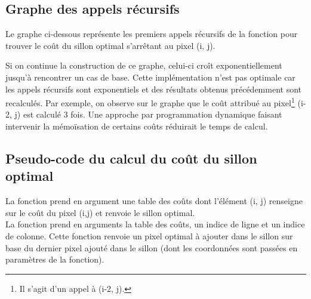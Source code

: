 \documentclass[a4paper, 11pt, oneside]{article}
\begin{document}
\subsection{Graphe des appels récursifs}

Le graphe ci-dessous représente les premiers appels récursifs de la fonction pour trouver le coût du sillon optimal s'arrêtant au pixel (i, j). 

\begin{center}
\end{center}

Si on continue la construction de ce graphe, celui-ci croît exponentiellement jusqu'à rencontrer un cas de base. Cette implémentation n'est pas optimale car les appels récursifs sont exponentiels et des résultats obtenus précédemment sont recalculés. Par exemple, on observe sur le graphe que le coût attribué au pixel\footnote{Il s'agit d'un appel à (i-2, j).} (i-2, j) est calculé 3 fois. Une approche par programmation dynamique faisant intervenir la mémoïsation de certains coûts réduirait le temps de calcul.

\subsection{Pseudo-code du calcul du coût du sillon optimal}

La fonction  prend en argument une table des coûts dont l'élément (i, j) renseigne sur le coût du pixel (i,j) et renvoie le sillon optimal.\\La fonction  prend en arguments la table des coûts, un indice de ligne et un indice de colonne. Cette fonction renvoie un pixel optimal à ajouter dans le sillon sur base du dernier pixel ajouté dans le sillon (dont les coordonnées sont passées en paramètres de la fonction).
\end{document}
